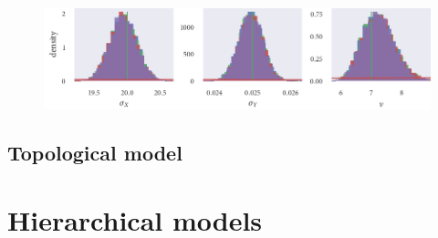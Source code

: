 \begin{figure}
    \includegraphics{stan_gauss_hist.pdf}
    \caption{}
\end{figure}

\subsection{Topological model}

\section{Hierarchical models}
